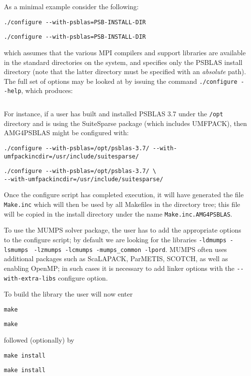 As a minimal example consider the following:
\ifpdf
\begin{verbatim}
./configure --with-psblas=PSB-INSTALL-DIR
\end{verbatim}
\else
\begin{verbatim}
./configure --with-psblas=PSB-INSTALL-DIR
\end{verbatim}
\fi
which assumes that the various MPI compilers and support libraries are
available in the standard directories on the system, and specifies
only the PSBLAS install  directory (note that the latter directory must
be specified with an {\em absolute} path).
The full set of options may be looked at by issuing the command
\verb|./configure --help|, which produces:
\ifpdf
\inputminted[breaklines=true,bgcolor=bg,fontsize=\small]{console}{../configureout.txt}
\else

\fi
For instance, if a user has built and installed PSBLAS 3.7 under the
\verb|/opt| directory and is
using the SuiteSparse package (which includes UMFPACK), then AMG4PSBLAS
might be configured with:
\ifpdf
\begin{verbatim}
./configure --with-psblas=/opt/psblas-3.7/ --with-umfpackincdir=/usr/include/suitesparse/
\end{verbatim}
\else
\begin{verbatim}
./configure --with-psblas=/opt/psblas-3.7/ \
--with-umfpackincdir=/usr/include/suitesparse/
\end{verbatim}
\fi
Once the configure script has completed execution, it will have
generated the file \verb|Make.inc| which will then be used by all
Makefiles in the directory tree; this file will be copied in the
install directory under the name \verb|Make.inc.AMG4PSBLAS|.

To use the MUMPS solver package,
the user has to add the appropriate options to the configure script;
by default we are looking for the libraries
\verb|-ldmumps -lsmumps| \verb| -lzmumps -lcmumps -mumps_common -lpord|.
MUMPS often uses additional packages such as ScaLAPACK, ParMETIS,
SCOTCH, as well as enabling OpenMP; in such cases it is necessary to
add linker options with the \verb|--with-extra-libs| configure option.

To build the library the user will now enter
\ifpdf
\begin{verbatim}
make
\end{verbatim}
\else
\begin{verbatim}
make
\end{verbatim}
\fi
followed (optionally) by
\ifpdf
\begin{verbatim}
make install
\end{verbatim}
\else
\begin{verbatim}
make install
\end{verbatim}
\fi
